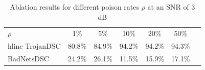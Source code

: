 \documentclass[journal]{IEEEtran}
\begin{document}
\begin{table}[htbp]
    \centering
        \caption{{Ablation results for different poison rates $\rho$ at an SNR of 3 dB}}
    \begin{tabular}{lcccccc}
    \hline\hline
        $\rho$ & 1\%&  5\%&  10\%&  20\%&  50\%\\hline
        TrojanDSC & 80.8\%& 84.9\%& 94.2\%& 94.2\%& 94.3\%\\
        BadNetsDSC& 24.2\%& 26.1\%& 11.5\%& 15.9\%&  17.1\% \\
        \hline         \hline
    \end{tabular}
    
    \label{tab:abla2}
\end{table}
\end{document}
